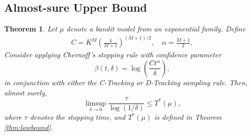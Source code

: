 \documentclass[final]{IEEEtran}
\newtheorem{theorem}{Theorem}
\begin{document}
\subsection{Almost-sure Upper Bound}
\begin{theorem}
Let $\mu$ denote a bandit model from an exponential family. Define
\begin{align*}
C = K^M \left( \frac{4}{M+1} \right)^{(M+1)/2}, \quad \alpha = \frac{M+1}{2},
\end{align*}
Consider applying Chernoff's stopping rule with confidence parameter 
\[
\beta(t, \delta) = \log \left( \frac{C t^{\alpha}}{\delta} \right),
\]
in conjunction with either the C-Tracking or D-Tracking sampling rule. Then, almost surely,
\[
\limsup_{\delta \to 0} \frac{\tau}{\log(1/\delta)} \leq T^*(\mu),
\]
where $\tau$ denotes the stopping time, and $T^*(\mu)$ is defined in Theorem \ref{thm:lowbound}.
\end{theorem}
\end{document}
